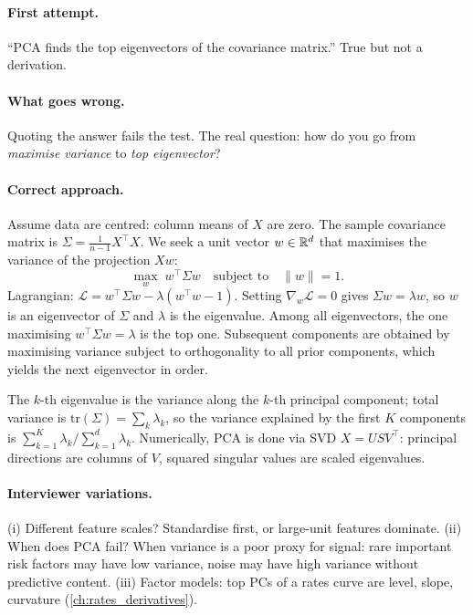 \paragraph{First attempt.}
``PCA finds the top eigenvectors of the covariance matrix.''
True but not a derivation.

\paragraph{What goes wrong.}
Quoting the answer fails the test.  The real question: how do
you go from \emph{maximise variance} to \emph{top eigenvector}?

\paragraph{Correct approach.}
Assume data are centred: column means of $X$ are zero.  The
sample covariance matrix is
$\Sigma = \tfrac{1}{n-1} X^\top X$.  We seek a unit vector
$w \in \mathbb{R}^d$ that maximises the variance of the projection
$X w$:
\[
\max_{w} \; w^\top \Sigma w \quad\text{subject to}\quad \|w\| = 1.
\]
Lagrangian: $\mathcal L = w^\top \Sigma w - \lambda(w^\top w - 1)$.
Setting $\nabla_w \mathcal L = 0$ gives $\Sigma w = \lambda w$,
so $w$ is an eigenvector of $\Sigma$ and $\lambda$ is the
eigenvalue.  Among all eigenvectors, the one maximising
$w^\top \Sigma w = \lambda$ is the top one.  Subsequent components
are obtained by maximising variance subject to orthogonality to
all prior components, which yields the next eigenvector in order.

The $k$-th eigenvalue is the variance along the $k$-th principal
component; total variance is $\mathrm{tr}(\Sigma) = \sum_k
\lambda_k$, so the variance explained by the first $K$ components
is $\sum_{k=1}^K \lambda_k / \sum_{k=1}^d \lambda_k$.
Numerically, PCA is done via SVD $X = U S V^\top$: principal
directions are columns of $V$, squared singular values are scaled
eigenvalues.

\paragraph{Interviewer variations.}
(i) Different feature scales?  Standardise first, or large-unit
features dominate.  (ii) When does PCA fail?  When variance is a
poor proxy for signal: rare important risk factors may have
low variance, noise may have high variance without predictive
content.  (iii) Factor models: top PCs of a rates curve are
level, slope, curvature (\cref{ch:rates_derivatives}).

